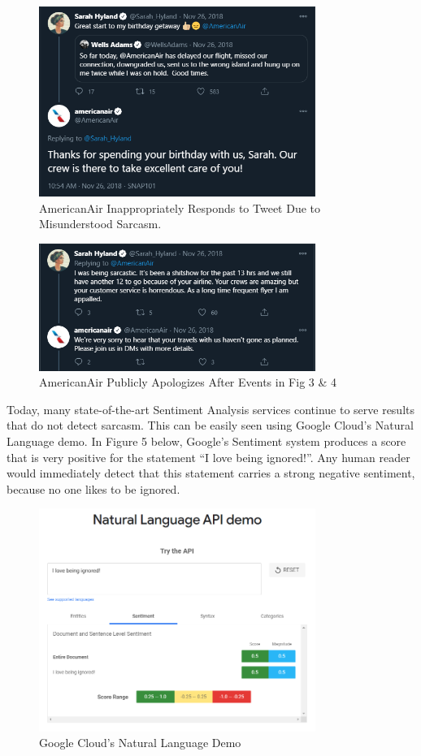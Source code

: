 \documentclass[conference]{IEEEtran}
\begin{document}
\begin{figure}[htbp]
\centerline{\includegraphics[width=9cm]{image6.png}}
\caption{AmericanAir Inappropriately Responds to Tweet Due to Misunderstood Sarcasm.}
\label{fig4}
\end{figure}


\begin{figure}[htbp]
\centerline{\includegraphics[width=9cm]{image7.png}}
\caption{AmericanAir Publicly Apologizes After Events in Fig 3 \& 4}
\label{fig5}
\end{figure}

Today, many state-of-the-art Sentiment Analysis services continue to serve results that do not detect sarcasm. This can be easily seen using Google Cloud’s Natural Language demo. In Figure 5 below, Google’s Sentiment system produces a score that is very positive for the statement “I love being ignored!”. Any human reader would immediately detect that this statement carries a strong negative sentiment, because no one likes to be ignored. \\

\begin{figure}[htbp]
\centerline{\includegraphics[width=9cm]{image8.png}}
\caption{Google Cloud’s Natural Language Demo}
\label{fig6}
\end{figure}
\end{document}
